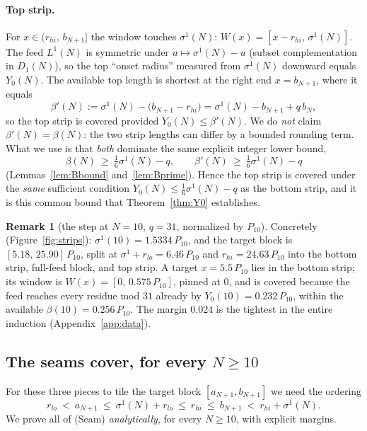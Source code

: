 \documentclass[11pt]{amsart}
\theoremstyle{plain}
\theoremstyle{definition}
\newtheorem{remark}[theorem]{Remark}
\begin{document}
\paragraph{Top strip.}
For $x\in(r_{hi},\,b_{N+1}]$ the window touches $\sigma^1(N)$:
$W(x)=[x-r_{hi},\,\sigma^1(N)]$.  The feed $L^1(N)$ is symmetric under
$u\mapsto\sigma^1(N)-u$ (subset complementation in $D_1(N)$), so the top
``onset radius'' measured from $\sigma^1(N)$ downward equals $Y_0(N)$.  The
available top length is shortest at the right end $x=b_{N+1}$, where it equals
\[
\beta'(N):=\sigma^1(N)-\bigl(b_{N+1}-r_{hi}\bigr)=\sigma^1(N)-b_{N+1}+q\,b_N,
\]
so the top strip is covered provided $Y_0(N)\le \beta'(N)$.  We do \emph{not} claim
$\beta'(N)=\beta(N)$: the two strip lengths can differ by a bounded rounding term.  What
we use is that \emph{both} dominate the same explicit integer lower bound,
\[
\beta(N)\ \ge\ \tfrac16\sigma^1(N)-q,
\qquad
\beta'(N)\ \ge\ \tfrac16\sigma^1(N)-q
\tag{LB}
\]
(Lemmas~\ref{lem:Bbound} and~\ref{lem:Bprime}).  Hence the top strip is covered under
the \emph{same} sufficient condition $Y_0(N)\le\tfrac16\sigma^1(N)-q$ as the bottom strip,
and it is this common bound that Theorem~\ref{thm:Y0} establishes.

\begin{remark}[the step at $N=10$, $q=31$, normalized by $P_{10}$]
Concretely (Figure~\ref{fig:strips}): $\sigma^1(10)=1.5334\,P_{10}$, and the target
block is $[5.18,\,25.90]\,P_{10}$, split at $\sigma^1{+}r_{lo}=6.46\,P_{10}$ and
$r_{hi}=24.63\,P_{10}$ into the bottom strip, full-feed block, and top strip.  A
target $x=5.5\,P_{10}$ lies in the bottom strip; its window is
$W(x)=[0,\,0.575\,P_{10}]$, pinned at $0$, and is covered because the feed reaches
every residue mod $31$ already by $Y_0(10)=0.232\,P_{10}$, within the available
$\beta(10)=0.256\,P_{10}$.  The margin $0.024$ is the tightest in the entire
induction (Appendix~\ref{app:data}).
\end{remark}

\subsection{The seams cover, for every \texorpdfstring{$N\ge10$}{N>=10}}
For these three pieces to tile the target block $[a_{N+1},b_{N+1}]$ we need the
ordering
\[
r_{lo}\ <\ a_{N+1}\ \le\ \sigma^1(N)+r_{lo}\ \le\ r_{hi}\ \le\ b_{N+1}\ <\ r_{hi}+\sigma^1(N).
\tag{Seam}
\]
We prove all of (Seam) \emph{analytically}, for every $N\ge10$, with explicit
margins.
\end{document}
